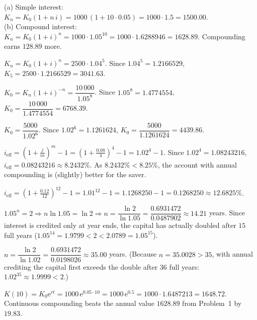 \begin{solutions}
  \item (a) Simple interest: $K_{n}=K_{0}(1+n\,i)
        =1000\,(1+10\cdot 0.05)=1000\cdot 1.5=1500.00$.\\
        (b) Compound interest: $K_{n}=K_{0}(1+i)^{n}
        =1000\cdot 1.05^{10}=1000\cdot 1.6288946=1628.89$.
        Compounding earns $128.89$ more.

  \item $K_{n}=K_{0}(1+i)^{n}=2500\cdot 1.04^{5}$. Since
        $1.04^{5}=1.2166529$,
        $K_{5}=2500\cdot 1.2166529=3041.63$.

  \item $K_{0}=K_{n}(1+i)^{-n}=\dfrac{10\,000}{1.05^{8}}$. Since
        $1.05^{8}=1.4774554$,
        $K_{0}=\dfrac{10\,000}{1.4774554}=6768.39$.

  \item $K_{0}=\dfrac{5000}{1.02^{6}}$. Since $1.02^{6}=1.1261624$,
        $K_{0}=\dfrac{5000}{1.1261624}=4439.86$.

  \item $i_{\mathrm{eff}}=\left(1+\frac{j}{m}\right)^{m}-1
        =\left(1+\frac{0.08}{4}\right)^{4}-1=1.02^{4}-1$. Since
        $1.02^{4}=1.08243216$,
        $i_{\mathrm{eff}}=0.08243216\approx 8.2432\%$. As
        $8.2432\%<8.25\%$, the account with annual compounding is
        (slightly) better for the saver.

  \item $i_{\mathrm{eff}}=\left(1+\frac{0.12}{12}\right)^{12}-1
        =1.01^{12}-1=1.1268250-1=0.1268250\approx 12.6825\%$.

  \item $1.05^{n}=2\Rightarrow n\ln 1.05=\ln 2\Rightarrow
        n=\dfrac{\ln 2}{\ln 1.05}=\dfrac{0.6931472}{0.0487902}
        \approx 14.21$ years. Since interest is credited only at year
        ends, the capital has actually doubled after $15$ full years
        ($1.05^{14}=1.9799<2<2.0789=1.05^{15}$).

  \item $n=\dfrac{\ln 2}{\ln 1.02}=\dfrac{0.6931472}{0.0198026}
        \approx 35.00$ years. (Because $n=35.0028>35$, with annual
        crediting the capital first exceeds the double after $36$ full
        years: $1.02^{35}\approx 1.9999<2$.)

  \item $K(10)=K_{0}\mathrm{e}^{rt}=1000\,\mathrm{e}^{0.05\cdot 10}
        =1000\,\mathrm{e}^{0.5}=1000\cdot 1.6487213=1648.72$.
        Continuous compounding beats the annual value $1628.89$ from
        Problem~1 by $19.83$.


\end{solutions}
